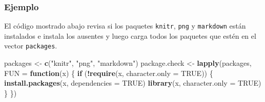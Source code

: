 \documentclass[10pt,]{krantz}
\makeatletter
\newenvironment{Shaded}{\begin{snugshade}}{\end{snugshade}}
\newcommand{\KeywordTok}[1]{\textcolor[rgb]{0.13,0.29,0.53}{\textbf{#1}}}
\newcommand{\DataTypeTok}[1]{\textcolor[rgb]{0.13,0.29,0.53}{#1}}
\newcommand{\StringTok}[1]{\textcolor[rgb]{0.31,0.60,0.02}{#1}}
\newcommand{\OtherTok}[1]{\textcolor[rgb]{0.56,0.35,0.01}{#1}}
\newcommand{\ControlFlowTok}[1]{\textcolor[rgb]{0.13,0.29,0.53}{\textbf{#1}}}
\newcommand{\OperatorTok}[1]{\textcolor[rgb]{0.81,0.36,0.00}{\textbf{#1}}}
\newcommand{\NormalTok}[1]{#1}
\newenvironment{kframe}{%
\medskip{}
\setlength{\fboxsep}{.8em}
 \def\at@end@of@kframe{}%
 \ifinner\ifhmode%
  \def\at@end@of@kframe{\end{minipage}}%
  \begin{minipage}{\columnwidth}%
 \fi\fi%
 \def\FrameCommand##1{\hskip\@totalleftmargin \hskip-\fboxsep
 \colorbox{shadecolor}{##1}\hskip-\fboxsep
     \hskip-\linewidth \hskip-\@totalleftmargin \hskip\columnwidth}%
 \MakeFramed {\advance\hsize-\width
   \@totalleftmargin\z@ \linewidth\hsize
   \@setminipage}}%
 {\par\unskip\endMakeFramed%
 \at@end@of@kframe}
\renewenvironment{Shaded}{\begin{kframe}}{\end{kframe}}
\makeatother
\begin{document}
\subsubsection*{Ejemplo}\label{ejemplo-28}

El código mostrado abajo revisa si los paquetes \texttt{knitr},
\texttt{png} y \texttt{markdown} están instalados e instala los ausentes
y luego carga todos los paquetes que estén en el vector
\texttt{packages}.

\begin{Shaded}
\begin{Highlighting}[]
\NormalTok{packages <-}\StringTok{  }\KeywordTok{c}\NormalTok{(}\StringTok{"knitr"}\NormalTok{, }\StringTok{"png"}\NormalTok{, }\StringTok{"markdown"}\NormalTok{)}
\NormalTok{package.check <-}\StringTok{ }\KeywordTok{lapply}\NormalTok{(packages, }\DataTypeTok{FUN =} \ControlFlowTok{function}\NormalTok{(x) \{}
  \ControlFlowTok{if}\NormalTok{ (}\OperatorTok{!}\KeywordTok{require}\NormalTok{(x, }\DataTypeTok{character.only =} \OtherTok{TRUE}\NormalTok{)) \{}
    \KeywordTok{install.packages}\NormalTok{(x, }\DataTypeTok{dependencies =} \OtherTok{TRUE}\NormalTok{)}
    \KeywordTok{library}\NormalTok{(x, }\DataTypeTok{character.only =} \OtherTok{TRUE}\NormalTok{)}
\NormalTok{  \}}
\NormalTok{\})}
\end{Highlighting}
\end{Shaded}


\end{document}
